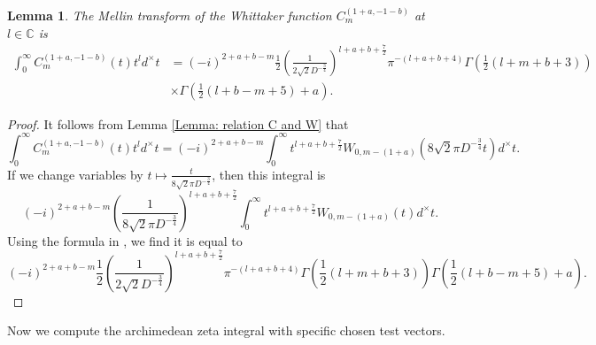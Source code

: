\documentclass[11pt, a4paper]{amsart}
\theoremstyle{plain}
\newtheorem{lemma}[theorem]{Lemma}
\theoremstyle{definition}
\numberwithin{equation}{section}
\def\CC{\mathbb{C}}
\begin{document}
\begin{lemma}
\label{Lemma:Mellin_Trans_Whittaker}
        The Mellin transform of the Whittaker function $C_{m}^{(1+a, -1-b)}$ at $l \in \CC$ is 
              \begin{align*}
                  \int_{0}^{\infty} C_{m}^{(1+a, -1-b)}(t) t^{l} d^{\times}t &= (-i)^{2 + a + b - m} \frac{1}{2} (\frac{1}{2\sqrt{2}D^{-\frac{3}{4}}})^{l + a + b + \frac{7}{2}}\pi^{-(l + a + b + 4)} \Gamma(\frac{1}{2}(l + m + b + 3) ) \\
                  & \times \Gamma(\frac{1}{2}(l + b - m + 5) + a). 
              \end{align*}
\end{lemma}

\begin{proof}
     It follows from Lemma \ref{Lemma: relation C and W} that 
     \begin{equation*}
         \int_{0}^{\infty} C_{m}^{(1 + a, -1 - b)}(t) t^{l} d^{\times}t = (-i)^{2 + a + b - m} \int_{0}^{\infty} t^{l + a + b + \frac{7}{2}} W_{0, m-(1 + a)}(8\sqrt{2} \pi D^{-\frac{3}{4}}t) d^{\times}t.  
     \end{equation*}
     If we change variables by $t \mapsto \frac{t}{8\sqrt{2}\pi D^{-\frac{3}{4}}}$, then this integral is 
     \begin{equation*}
         (-i)^{2 + a + b - m} (\frac{1}{8\sqrt{2}\pi D^{-\frac{3}{4}}})^{l + a + b + \frac{7}{2}}  \int_{0}^{\infty} t^{l + a + b + \frac{7}{2}} W_{0, m-(1 + a)}(t) d^{\times}t. 
     \end{equation*}
     Using the formula in \cite[\S 5.2, P979]{Koseki-Oda95}, we find it is equal to 
     \begin{equation*}
         (-i)^{2 + a + b - m} \frac{1}{2} (\frac{1}{2\sqrt{2}D^{-\frac{3}{4}}})^{l + a + b + \frac{7}{2}}\pi^{-(l + a + b + 4)} \Gamma(\frac{1}{2}(l + m + b + 3) ) \Gamma(\frac{1}{2}(l + b - m + 5) + a). 
     \end{equation*}
\end{proof}

Now we compute the archimedean zeta integral with specific chosen test vectors. 
\end{document}

